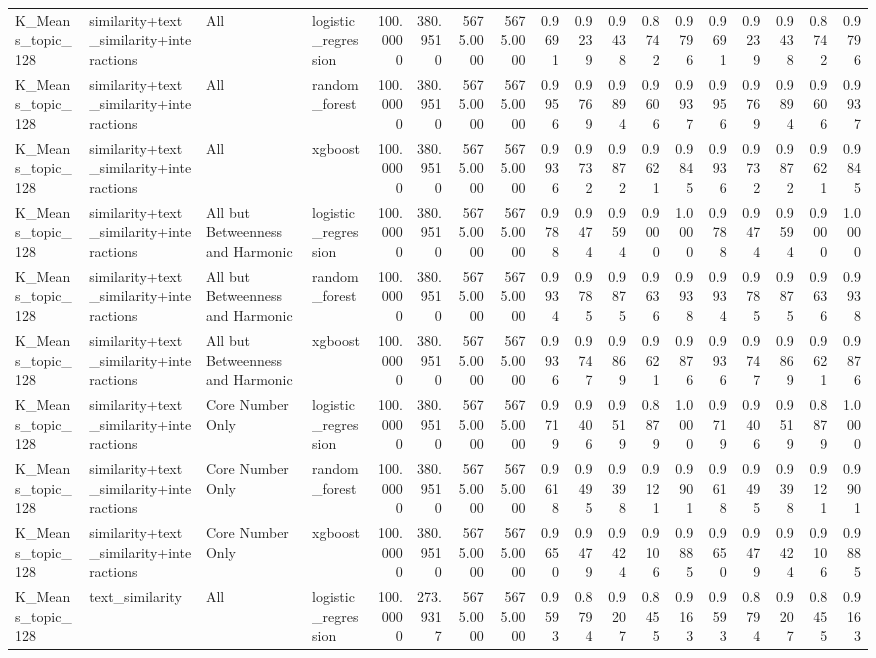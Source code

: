 \begin{tabular}{llllrrrrrrrrrrrrrr}
K_Means_topic_128 & similarity+text_similarity+interactions & All & logistic_regression & 100.0000 & 380.9510 & 5675.0000 & 5675.0000 & 0.9691 & 0.9239 & 0.9438 & 0.8742 & 0.9796 & 0.9691 & 0.9239 & 0.9438 & 0.8742 & 0.9796 \\
K_Means_topic_128 & similarity+text_similarity+interactions & All & random_forest & 100.0000 & 380.9510 & 5675.0000 & 5675.0000 & 0.9956 & 0.9769 & 0.9894 & 0.9606 & 0.9937 & 0.9956 & 0.9769 & 0.9894 & 0.9606 & 0.9937 \\
K_Means_topic_128 & similarity+text_similarity+interactions & All & xgboost & 100.0000 & 380.9510 & 5675.0000 & 5675.0000 & 0.9936 & 0.9732 & 0.9872 & 0.9621 & 0.9845 & 0.9936 & 0.9732 & 0.9872 & 0.9621 & 0.9845 \\
K_Means_topic_128 & similarity+text_similarity+interactions & All but Betweenness and Harmonic & logistic_regression & 100.0000 & 380.9510 & 5675.0000 & 5675.0000 & 0.9788 & 0.9474 & 0.9594 & 0.9000 & 1.0000 & 0.9788 & 0.9474 & 0.9594 & 0.9000 & 1.0000 \\
K_Means_topic_128 & similarity+text_similarity+interactions & All but Betweenness and Harmonic & random_forest & 100.0000 & 380.9510 & 5675.0000 & 5675.0000 & 0.9934 & 0.9785 & 0.9875 & 0.9636 & 0.9938 & 0.9934 & 0.9785 & 0.9875 & 0.9636 & 0.9938 \\
K_Means_topic_128 & similarity+text_similarity+interactions & All but Betweenness and Harmonic & xgboost & 100.0000 & 380.9510 & 5675.0000 & 5675.0000 & 0.9936 & 0.9747 & 0.9869 & 0.9621 & 0.9876 & 0.9936 & 0.9747 & 0.9869 & 0.9621 & 0.9876 \\
K_Means_topic_128 & similarity+text_similarity+interactions & Core Number Only & logistic_regression & 100.0000 & 380.9510 & 5675.0000 & 5675.0000 & 0.9719 & 0.9406 & 0.9519 & 0.8879 & 1.0000 & 0.9719 & 0.9406 & 0.9519 & 0.8879 & 1.0000 \\
K_Means_topic_128 & similarity+text_similarity+interactions & Core Number Only & random_forest & 100.0000 & 380.9510 & 5675.0000 & 5675.0000 & 0.9618 & 0.9495 & 0.9398 & 0.9121 & 0.9901 & 0.9618 & 0.9495 & 0.9398 & 0.9121 & 0.9901 \\
K_Means_topic_128 & similarity+text_similarity+interactions & Core Number Only & xgboost & 100.0000 & 380.9510 & 5675.0000 & 5675.0000 & 0.9650 & 0.9479 & 0.9424 & 0.9106 & 0.9885 & 0.9650 & 0.9479 & 0.9424 & 0.9106 & 0.9885 \\
K_Means_topic_128 & text_similarity & All & logistic_regression & 100.0000 & 273.9317 & 5675.0000 & 5675.0000 & 0.9593 & 0.8794 & 0.9207 & 0.8455 & 0.9163 & 0.9593 & 0.8794 & 0.9207 & 0.8455 & 0.9163 \\

\end{tabular}

